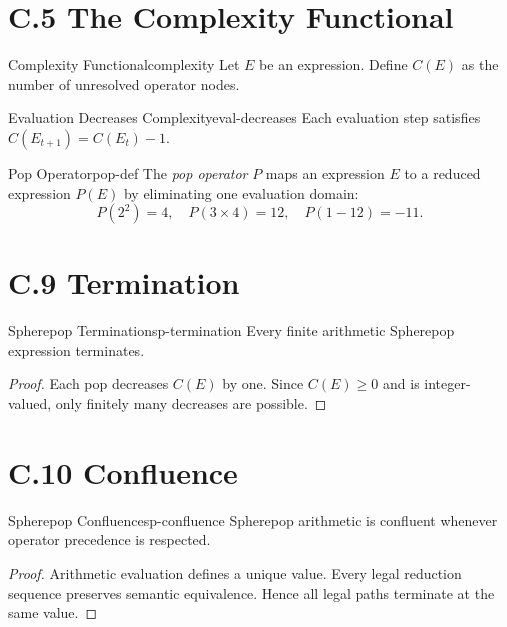 \section*{C.5 The Complexity Functional}

\begin{definition}{Complexity Functional}{complexity}
  Let $E$ be an expression. Define $C(E)$ as the number of unresolved
  operator nodes.
\end{definition}

\begin{proposition}{Evaluation Decreases Complexity}{eval-decreases}
  Each evaluation step satisfies $C(E_{t+1}) = C(E_t) - 1$.
\end{proposition}

\begin{definition}{Pop Operator}{pop-def}
  The \emph{pop operator} $P$ maps an expression $E$ to a reduced
  expression $P(E)$ by eliminating one evaluation domain:
  \[
    P(2^2) = 4, \quad P(3 \times 4) = 12, \quad P(1 - 12) = -11.
  \]
\end{definition}

\section*{C.9 Termination}

\begin{theorem}{Spherepop Termination}{sp-termination}
  Every finite arithmetic Spherepop expression terminates.
\end{theorem}

\begin{proof}
  Each pop decreases $C(E)$ by one. Since $C(E) \geq 0$ and is
  integer-valued, only finitely many decreases are possible.
\end{proof}

\section*{C.10 Confluence}

\begin{theorem}{Spherepop Confluence}{sp-confluence}
  Spherepop arithmetic is confluent whenever operator precedence is respected.
\end{theorem}

\begin{proof}
  Arithmetic evaluation defines a unique value. Every legal reduction sequence
  preserves semantic equivalence. Hence all legal paths terminate at the same value.
\end{proof}

